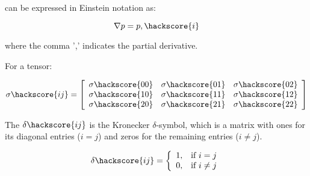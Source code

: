 can be expressed in Einstein notation as:

\begin{equation}
\nabla p = p,\hackscore{i}
\label{NOTATION5}
\end{equation}

where the comma ',' indicates the partial derivative.

For a tensor:

\begin{equation}
\sigma \hackscore{ij}= 
\left[ \begin{array}{ccc}
\sigma\hackscore{00} & \sigma\hackscore{01} & \sigma\hackscore{02} \\
\sigma\hackscore{10} & \sigma\hackscore{11} & \sigma\hackscore{12} \\
\sigma\hackscore{20} & \sigma\hackscore{21} & \sigma\hackscore{22} \\
\end{array} \right]
\label{NOTATION6}
\end{equation}


The $\delta\hackscore{ij}$ is the Kronecker $\delta$-symbol, which is a matrix with ones for its diagonal entries ($i = j$) and zeros for the remaining entries ($i \neq j$).

\begin{equation}
\delta \hackscore{ij} = 
\left \{ \begin{array}{cc}
1, & \mbox{if $i = j$} \\
0, & \mbox{if $i \neq j$} \\
\end{array}
\right.
\label{KRONECKER}
\end{equation}
